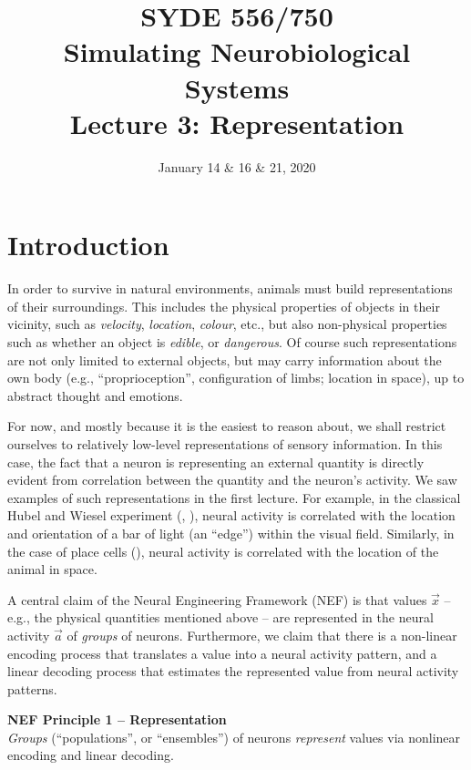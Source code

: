\documentclass[10pt,letterpaper,oneside]{article}
\date{January 14 \& 16 \& 21, 2020}
\title{SYDE 556/750 \\ Simulating Neurobiological Systems \\ Lecture 3: Representation}
\begin{document}

\section{Introduction}


In order to survive in natural environments, animals must build representations of their surroundings. This includes the physical properties of objects in their vicinity, such as \emph{velocity}, \emph{location}, \emph{colour}, etc., but also non-physical properties such as whether an object is \emph{edible}, or \emph{dangerous}. Of course such representations are not only limited to external objects, but may carry information about the own body (e.g., \enquote{proprioception}, configuration of limbs; location in space), up to abstract thought and emotions.

For now, and mostly because it is the easiest to reason about, we shall restrict ourselves to relatively low-level representations of sensory information. In this case, the fact that a neuron is representing an external quantity is directly evident from correlation between the quantity and the neuron's activity.  We saw examples of such representations in the first lecture. For example, in the classical Hubel and Wiesel experiment (, \cite{hubel1959receptive}), neural activity is correlated with the location and orientation of a bar of light (an \enquote{edge}) within the visual field. Similarly, in the case of place cells (), neural activity is correlated with the location of the animal in space.

A central claim of the Neural Engineering Framework (NEF) is that values $\vec x$ -- e.g., the physical quantities mentioned above -- are represented in the neural activity $\vec a$ of \emph{groups} of neurons. Furthermore, we claim that there is a non-linear encoding process that translates a value into a neural activity pattern, and a linear decoding process that estimates the represented value from neural activity patterns.

\begin{mdframed}
\textbf{NEF Principle 1 -- Representation}\\
\emph{Groups} (\enquote{populations}, or \enquote{ensembles}) of neurons \emph{represent} values via nonlinear encoding and linear decoding.
\end{mdframed}
\end{document}

